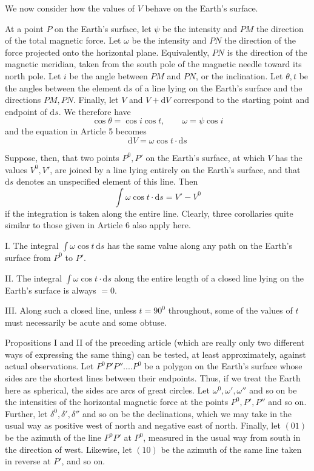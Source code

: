 We now consider how the values of $V$ behave on the Earth's surface.

At a point $P$ on the Earth's surface, let $\psi$ be the intensity and $PM$ the direction of the total magnetic force. Let $\omega$ be the intensity and $PN$ the direction of the force projected onto the horizontal plane. Equivalently, $PN$ is the direction of the magnetic meridian, taken from the south pole of the magnetic needle toward its north pole. Let $i$ be the angle between $PM$ and $PN$, or the inclination. Let $\theta,t$ be the angles between the element $\mathrm{d}s$ of a line lying on the Earth's surface and the directions $PM,PN$. Finally, let $V$ and $V+\mathrm{d}V$ correspond to the starting point and endpoint of $\mathrm{d}s$. We therefore have
\[
\cos\theta=\cos i\cos t,\qquad \omega=\psi\cos i
\]
and the equation in Article 5 becomes
\[
\mathrm{d}V=\omega\cos t\cdot\mathrm{d}s
\]

Suppose, then, that two points $P^0,P'$ on the Earth's surface, at which $V$ has the values $V^0,V'$, are joined by a line lying entirely on the Earth's surface, and that $\mathrm{d}s$ denotes an unspecified element of this line. Then
\[
\int\omega\cos t\cdot\mathrm{d}s=V'-V^0
\]
if the integration is taken along the entire line. Clearly, three corollaries quite similar to those given in Article 6 also apply here.

I. The integral $\int\omega\cos t\,\mathrm{d}s$ has the same value along any path on the Earth's surface from $P^0$ to $P'$.

II. The integral $\int\omega\cos t\cdot\mathrm{d}s$ along the entire length of a closed line lying on the Earth's surface is always $=0$.

III. Along such a closed line, unless $t=90^0$ throughout, some of the values of $t$ must necessarily be acute and some obtuse.

Propositions I and II of the preceding article (which are really only two different ways of expressing the same thing) can be tested, at least approximately, against actual observations. Let $P^0P'P''....P^0$ be a polygon on the Earth's surface whose sides are the shortest lines between their endpoints. Thus, if we treat the Earth here as spherical, the sides are arcs of great circles. Let $\omega^0,\omega',\omega''$ and so on be the intensities of the horizontal magnetic force at the points $P^0,P',P''$ and so on. Further, let $\delta^0,\delta',\delta''$ and so on be the declinations, which we may take in the usual way as positive west of north and negative east of north. Finally, let $(01)$ be the azimuth of the line $P^0P'$ at $P^0$, measured in the usual way from south in the direction of west. Likewise, let $(10)$ be the azimuth of the same line taken in reverse at $P'$, and so on.

